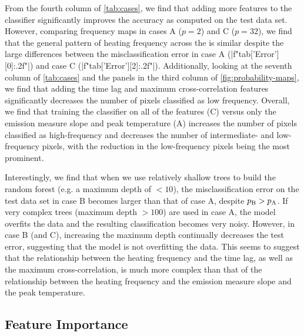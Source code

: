 From the fourth column of \autoref{tab:cases}, we find that adding more features to the classifier significantly improves the accuracy as computed on the test data set.
However, comparing frequency maps in cases A ($p=2$) and C ($p=32$), we find that the general pattern of heating frequency across the \AR{} is similar despite the large differences between the misclassification error in case A (\py[manager_ml]|f"{tab['Error'][0]:.2f}"|) and case C (\py[manager_ml]|f"{tab['Error'][2]:.2f}"|).
Additionally, looking at the seventh column of \autoref{tab:cases} and the panels in the third column of \autoref{fig:probability-maps}, we find that adding the time lag and maximum cross-correlation features significantly decreases the number of pixels classified as low frequency.
Overall, we find that training the classifier on all of the features (C) versus only the emission measure slope and peak temperature (A) increases the number of pixels classified as high-frequency and decreases the number of intermediate- and low-frequency pixels, with the reduction in the low-frequency pixels being the most prominent.

Interestingly, we find that when we use relatively shallow trees to build the random forest (e.g. a maximum depth of $<10$), the misclassification error on the test data set in case B becomes larger than that of case A, despite $p_\textup{B}>p_\textup{A}$.
If very complex trees (maximum depth $>100$) are used in case A, the model overfits the data and the resulting classification becomes very noisy. 
However, in case B (and C), increasing the maximum depth continually decreases the test error, suggesting that the model is not overfitting the data. 
This seems to suggest that the relationship between the heating frequency and the time lag, as well as the maximum cross-correlation, is much more complex than that of the relationship between the heating frequency and the emission measure slope and the peak temperature.

\subsection{Feature Importance}\label{sec:feature-importance}

